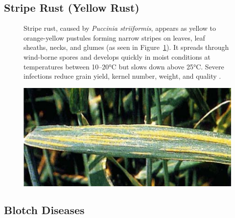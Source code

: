 \subsection{Stripe Rust (Yellow Rust)}
\begin{figure}[H]
    \centering
    \begin{minipage}{0.65\textwidth}
        \small
        Stripe rust, caused by \textit{Puccinia striiformis}, appears as yellow to orange-yellow pustules forming narrow stripes on leaves, leaf sheaths, necks, and glumes (as seen in Figure~\ref{fig:Figure05}). It spreads through wind-borne spores and develops quickly in moist conditions at temperatures between 10–20°C but slows down above 25°C. Severe infections reduce grain yield, kernel number, weight, and quality \parencite{duveiller2012wheat}.
    \end{minipage}%
    \hfill
    \begin{minipage}{0.3\textwidth}
        \centering
        \includegraphics[width=0.9\linewidth, angle=90]{chapters/chapter2/images/Figure05.png}
        \label{fig:Figure05}
    \end{minipage}
\end{figure}

\subsection{Blotch Diseases} 

